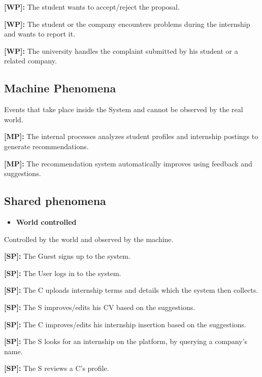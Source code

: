 \textbf{[WP\cw]:} The student wants to accept/reject the proposal.

\textbf{[WP\cw]:} The student or the company encounters problems during the internship and wants to report it.

\textbf{[WP\cw]:} The university handles the complaint submitted by his student or a related company.

\subsection{Machine Phenomena}
\label{subsec:machine_phenomena}%

Events that take place inside the System and cannot be observed by the
real world.

\setcounter{m}{1}
\newcommand{\cm}{\them{}}
\textbf{[MP\cm]:} The internal processes analyzes student profiles and internship postings to generate recommendations.

\textbf{[MP\cm]:} The recommendation system automatically improves using feedback and suggestions.

\subsection{Shared phenomena}
\label{subsec:shared_phenomena}%

\begin{itemize}
\item
  \textbf{World controlled}
\end{itemize}

Controlled by the world and observed by the machine.

\setcounter{s}{1}
\newcommand{\cs}{\thes{}}
\textbf{[SP\cs]:} The Guest signs up to the system.

\textbf{[SP\cs]:} The User logs in to the system.

\textbf{[SP\cs]:} The C uploads internship terms and details which the system then collects.

\textbf{[SP\cs]:} The S improves/edits his CV based on the suggestions.

\textbf{[SP\cs]:} The C improves/edits his internship insertion based on the suggestions.

\textbf{[SP\cs]:} The S looks for an internship on the platform, by querying a company's name.

\textbf{[SP\cs]:} The S reviews a C's profile.


